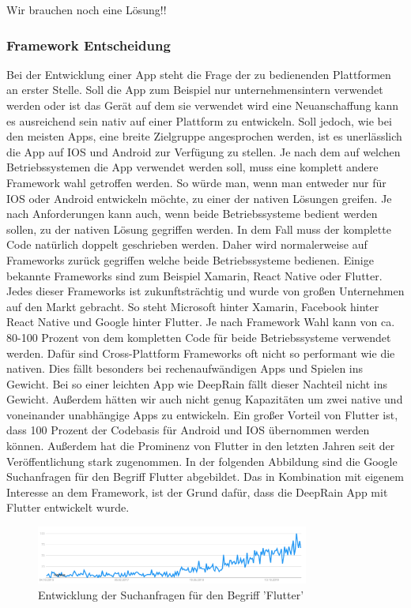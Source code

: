 Wir brauchen noch eine Lösung!! 

\subsubsection{Framework Entscheidung}\label{framework entscheidung}
Bei der Entwicklung einer App steht die Frage der zu bedienenden Plattformen an erster Stelle. Soll die App zum Beispiel nur unternehmensintern verwendet 
werden oder ist das Gerät auf dem sie verwendet wird eine Neuanschaffung kann es ausreichend sein nativ auf einer Plattform zu entwickeln. Soll jedoch, 
wie bei den meisten Apps, eine breite Zielgruppe angesprochen werden, ist es unerlässlich die App auf IOS und Android zur Verfügung zu stellen. 
Je nach dem auf welchen Betriebssystemen die App verwendet werden soll, muss eine komplett andere Framework wahl getroffen werden. 
So würde man, wenn man entweder nur für IOS oder Android entwickeln möchte, zu einer der nativen Lösungen greifen. Je nach Anforderungen kann auch, 
wenn beide Betriebssysteme bedient werden sollen, zu der nativen Lösung gegriffen werden. In dem Fall muss der komplette Code natürlich doppelt 
geschrieben werden. Daher wird normalerweise auf Frameworks zurück gegriffen welche beide Betriebssysteme bedienen. 
Einige bekannte Frameworks sind zum Beispiel Xamarin, React Native oder Flutter. Jedes dieser Frameworks ist zukunftsträchtig und wurde von großen 
Unternehmen auf den Markt gebracht. So steht Microsoft hinter Xamarin, Facebook hinter React Native und Google hinter Flutter. 
Je nach Framework Wahl kann von ca. 80-100 Prozent von dem kompletten Code für beide Betriebssysteme verwendet werden. 
Dafür sind Cross-Plattform Frameworks oft nicht so performant wie die nativen. Dies fällt besonders bei rechenaufwändigen Apps und Spielen ins Gewicht. 
Bei so einer leichten App wie DeepRain fällt dieser Nachteil nicht ins Gewicht. Außerdem hätten wir auch nicht genug Kapazitäten um zwei native und 
voneinander unabhängige Apps zu entwickeln. 
Ein großer Vorteil von Flutter ist, dass 100 Prozent der Codebasis für Android und IOS übernommen werden können. Außerdem hat die Prominenz von 
Flutter in den letzten Jahren seit der Veröffentlichung stark zugenommen. In der folgenden Abbildung sind die Google Suchanfragen für den Begriff 
Flutter abgebildet.  Das in Kombination mit eigenem Interesse an dem Framework, ist der Grund dafür, dass die DeepRain App mit Flutter entwickelt wurde. 

\begin{figure}[h]
 \centering
 \includegraphics[width=0.8\textwidth,angle=0]{abb/flutter_google_trends}
 \caption[Entwicklung von Flutter]{Entwicklung der Suchanfragen für den Begriff 'Flutter'}
\label{fig:flutter_google_trends}
\end{figure}

